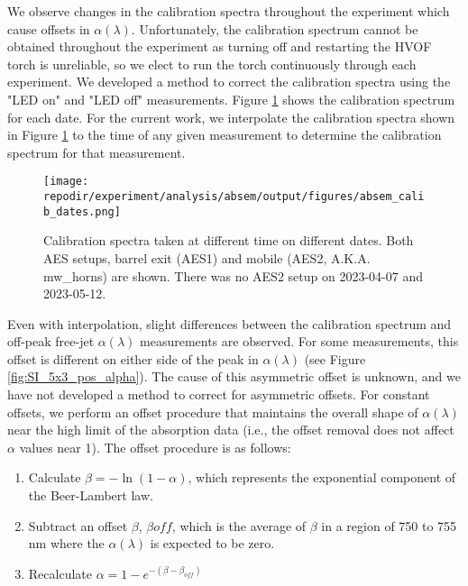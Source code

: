 We observe changes in the calibration spectra throughout the experiment which cause offsets in $\alpha(\lambda)$. Unfortunately, the calibration spectrum cannot be obtained throughout the experiment as turning off and restarting the HVOF torch is unreliable, so we elect to run the torch continuously through each experiment. We developed a method to correct the calibration spectra using the "LED on" and "LED off" measurements. Figure \ref{fig:SI_absem_calib_dates} shows the calibration spectrum for each date. For the current work, we interpolate the calibration spectra shown in Figure \ref{fig:SI_absem_calib_dates} to the time of any given measurement to determine the calibration spectrum for that measurement. 

\begin{figure}[]
    \centering
    \texttt{[image: \\repodir/experiment/analysis/absem/output/figures/absem\_calib\_dates.png]}
    \caption{Calibration spectra taken at different time on different dates. Both AES setups, barrel exit (AES1) and mobile (AES2, A.K.A. mw\_horns) are shown.  There was no AES2 setup on 2023-04-07 and 2023-05-12.}
    \label{fig:SI_absem_calib_dates}
\end{figure}


Even with interpolation, slight differences between the calibration spectrum and off-peak free-jet $\alpha(\lambda)$ measurements are observed. For some measurements, this offset is different on either side of the peak in $\alpha(\lambda)$ (see Figure \ref{fig:SI_5x3_pos_alpha}). The cause of this asymmetric offset is unknown, and we have not developed a method to correct for asymmetric offsets. For constant offsets, we perform an offset procedure that maintains the overall shape of $\alpha(\lambda)$ near the high limit of the absorption data (i.e., the offset removal does not affect $\alpha$ values near 1). The offset procedure is as follows:

\begin{enumerate}
    \item Calculate $\beta = -\ln(1 - \alpha)$, which represents the exponential component of the Beer-Lambert law. 
    \item Subtract an offset $\beta$, $\beta{off}$, which is the average of $\beta$ in a region of 750 to 755 nm where the $\alpha(\lambda)$ is expected to be zero. 
    \item Recalculate $\alpha = 1 - e^{- (\beta - \beta_{off})}$ 
\end{enumerate}

